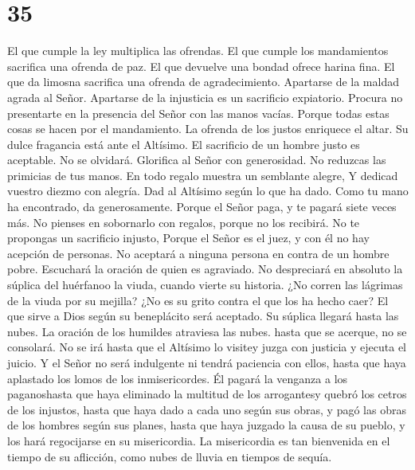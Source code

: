 \hypertarget{section-34}{%
\section{35}\label{section-34}}

 El que cumple la ley multiplica las ofrendas. El que
cumple los mandamientos sacrifica una ofrenda de paz.  El
que devuelve una bondad ofrece harina fina. El que da limosna sacrifica
una ofrenda de agradecimiento.  Apartarse de la maldad
agrada al Señor. Apartarse de la injusticia es un sacrificio expiatorio.
 Procura no presentarte en la presencia del Señor con las
manos vacías.  Porque todas estas cosas se hacen por el
mandamiento.  La ofrenda de los justos enriquece el altar.
Su dulce fragancia está ante el Altísimo.  El sacrificio
de un hombre justo es aceptable. No se olvidará. 
Glorifica al Señor con generosidad. No reduzcas las primicias de tus
manos.  En todo regalo muestra un semblante alegre, Y
dedicad vuestro diezmo con alegría.  Dad al Altísimo
según lo que ha dado. Como tu mano ha encontrado, da generosamente.
 Porque el Señor paga, y te pagará siete veces más.
 No pienses en sobornarlo con regalos, porque no los
recibirá. No te propongas un sacrificio injusto, Porque el Señor es el
juez, y con él no hay acepción de personas.  No aceptará
a ninguna persona en contra de un hombre pobre. Escuchará la oración de
quien es agraviado.  No despreciará en absoluto la
súplica del huérfanoo la viuda, cuando vierte su historia.
 ¿No corren las lágrimas de la viuda por su mejilla? ¿No
es su grito contra el que los ha hecho caer?  El que
sirve a Dios según su beneplácito será aceptado. Su súplica llegará
hasta las nubes.  La oración de los humildes atraviesa
las nubes. hasta que se acerque, no se consolará. No se irá hasta que el
Altísimo lo visitey juzga con justicia y ejecuta el juicio.
 Y el Señor no será indulgente ni tendrá paciencia con
ellos, hasta que haya aplastado los lomos de los inmisericordes. Él
pagará la venganza a los paganoshasta que haya eliminado la multitud de
los arrogantesy quebró los cetros de los injustos,  hasta
que haya dado a cada uno según sus obras, y pagó las obras de los
hombres según sus planes, hasta que haya juzgado la causa de su pueblo,
y los hará regocijarse en su misericordia.  La
misericordia es tan bienvenida en el tiempo de su aflicción, como nubes
de lluvia en tiempos de sequía.

